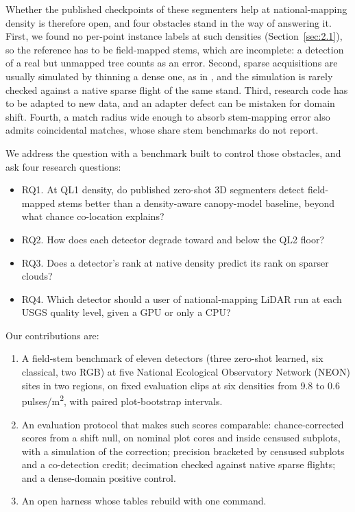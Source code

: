 \documentclass[preprint,12pt,authoryear,a4paper]{elsarticle}
\providecommand{\tightlist}{\setlength{\itemsep}{0pt}\setlength{\parskip}{0pt}}
\begin{document}
Whether the published checkpoints of these segmenters help at national-mapping
density is therefore open, and four obstacles stand in the way of answering it.
First, we found no per-point instance labels at such densities (Section~\ref{sec:2.1}), so
the reference has to be field-mapped stems, which are incomplete: a detection of
a real but unmapped tree counts as an error. Second, sparse acquisitions are
usually simulated by thinning a dense one, as in \citet{jakubowski2013tradeoffs}, and
the simulation is rarely checked against a native sparse flight of the same
stand. Third, research code has to be adapted to new data, and an adapter defect
can be mistaken for domain shift. Fourth, a match radius wide enough to absorb
stem-mapping error also admits coincidental matches, whose share stem benchmarks
do not report.

We address the question with a benchmark built to control those obstacles, and
ask four research questions:

\begin{itemize}
\tightlist
\item
  RQ1. At QL1 density, do published zero-shot 3D segmenters detect field-mapped
  stems better than a density-aware canopy-model baseline, beyond what chance
  co-location explains?
\item
  RQ2. How does each detector degrade toward and below the QL2 floor?
\item
  RQ3. Does a detector's rank at native density predict its rank on sparser
  clouds?
\item
  RQ4. Which detector should a user of national-mapping LiDAR run at each USGS
  quality level, given a GPU or only a CPU?
\end{itemize}

Our contributions are:

\begin{enumerate}
\tightlist
\item
  A field-stem benchmark of eleven detectors (three zero-shot learned, six
  classical, two RGB) at five National Ecological Observatory Network (NEON)
  sites in two regions, on fixed evaluation clips at six densities from 9.8 to
  0.6 pulses/m\textsuperscript{2}, with paired plot-bootstrap intervals.
\item
  An evaluation protocol that makes such scores comparable: chance-corrected
  scores from a shift null, on nominal plot cores and inside censused subplots,
  with a simulation of the correction; precision bracketed by censused subplots
  and a co-detection credit; decimation checked against native sparse flights;
  and a dense-domain positive control.
\item
  An open harness whose tables rebuild with one command.
\end{enumerate}
\end{document}
